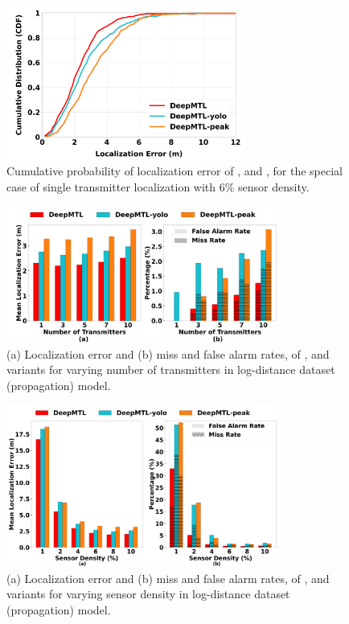\begin{figure}[ht]
	\centering
	\includegraphics[width=0.7\textwidth]{chapters/wowmom-pmc/figures/ours_cdf.png}
	\caption{Cumulative probability of localization error of \our, \ouryolo and \ourpeak, for the special case of single transmitter localization with 6\% sensor density.}
	\label{fig:ours_cdf}
\end{figure}

\begin{figure}[ht]
	\centering
	\includegraphics[width=0.8\textwidth]{chapters/wowmom-pmc/figures/ours_error_missfalse_vary_numintru.png}
	\caption{(a) Localization error and (b) miss and false alarm rates, of \our, \ouryolo and \ourpeak variants for varying number of transmitters in log-distance dataset (propagation) model.}
	\label{fig:ours_vary_numintru}
\end{figure}

\begin{figure}[ht]
	\centering
	\includegraphics[width=0.8\textwidth]{chapters/wowmom-pmc/figures/ours_error_missfalse_vary_sendensity.png}
	\caption{(a) Localization error and (b) miss and false alarm rates, of \our, \ouryolo and \ourpeak variants for varying sensor density in log-distance dataset (propagation) model.}
	\label{fig:ours_vary_sendensity}
\end{figure}



